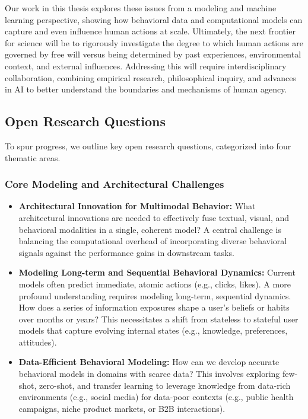 \begin{enumerate}
    Our work in this thesis explores these issues from a modeling and machine learning perspective, showing how behavioral data and computational models can capture and even influence human actions at scale. Ultimately, the next frontier for science will be to rigorously investigate the degree to which human actions are governed by free will versus being determined by past experiences, environmental context, and external influences. Addressing this will require interdisciplinary collaboration, combining empirical research, philosophical inquiry, and advances in AI to better understand the boundaries and mechanisms of human agency.



\end{enumerate}





\subsection{Open Research Questions}

To spur progress, we outline key open research questions, categorized into four thematic areas.

\subsubsection*{Core Modeling and Architectural Challenges}
\begin{itemize}
    \item \textbf{Architectural Innovation for Multimodal Behavior:} What architectural innovations are needed to effectively fuse textual, visual, and behavioral modalities in a single, coherent model? A central challenge is balancing the computational overhead of incorporating diverse behavioral signals against the performance gains in downstream tasks.
    
    \item \textbf{Modeling Long-term and Sequential Behavioral Dynamics:} Current models often predict immediate, atomic actions (e.g., clicks, likes). A more profound understanding requires modeling long-term, sequential dynamics. How does a series of information exposures shape a user's beliefs or habits over months or years? This necessitates a shift from stateless to stateful user models that capture evolving internal states (e.g., knowledge, preferences, attitudes).

    \item \textbf{Data-Efficient Behavioral Modeling:} How can we develop accurate behavioral models in domains with scarce data? This involves exploring few-shot, zero-shot, and transfer learning to leverage knowledge from data-rich environments (e.g., social media) for data-poor contexts (e.g., public health campaigns, niche product markets, or B2B interactions).
\end{itemize}

